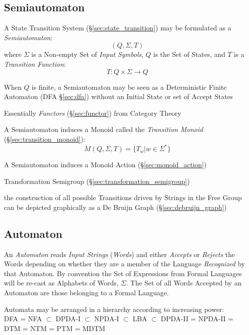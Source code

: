 \subsection{Semiautomaton}\label{sec:semiautomaton}

A State Transition System (\S\ref{sec:state_transition}) may be
formulated as a \emph{Semiautomaton}:
\[
  (Q,\Sigma,T)
\]
where $\Sigma$ is a Non-empty Set of \emph{Input Symbols}, $Q$ is the
Set of States, and $T$ is a \emph{Transition Function}:
\[
  T:Q \times \Sigma \rightarrow Q
\]

When $Q$ is finite, a Semiautomaton may be seen as a Deterministic
Finite Automaton (DFA \S\ref{sec:dfa}) without an Initial State or set
of Accept States

\fist Essentially \emph{Functors} (\S\ref{sec:functor}) from Category
Theory

A Semiautomaton induces a Monoid called the \emph{Transition Monoid}
(\S\ref{sec:transition_monoid}):
\[
  M(Q,\Sigma,T) = \{T_w | w \in \Sigma^*\}
\]

A Semiautomaton induces a Monoid Action (\S\ref{sec:monoid_action})

Transformation Semigroup (\S\ref{sec:transformation_semigroup})

the construction of all possible Transitions driven by Strings in the
Free Group can be depicted graphically as a De Bruijn Graph
(\S\ref{sec:debruijn_graph})




\subsection{Automaton} \label{sec:automaton}

An \emph{Automaton} reads \emph{Input Strings} (\emph{Words}) and
either \emph{Accepts} or \emph{Rejects} the Words depending on whether
they are a member of the Language \emph{Recognized} by that Automaton.
By convention the Set of Expressions from Formal Languages will be
re-cast as Alphabets of Words, $\Sigma$. The Set of all Words Accepted
by an Automaton are those belonging to a Formal Language.

Automata may be arranged in a hierarchy according to increasing
power:\\
DFA = NFA $\subset$ DPDA-I $\subset$ NPDA-I $\subset$ LBA
$\subset$ DPDA-II = NPDA-II = DTM = NTM = PTM = MDTM


